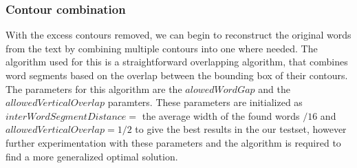 \documentclass{article}
\begin{document}
\subsubsection{Contour combination}
With the excess contours removed, we can begin to reconstruct the original words from the text by combining multiple contours into one where needed.
The algorithm used for this is a straightforward overlapping algorithm, that combines word segments based on the overlap between the bounding box of their contours.
The parameters for this algorithm are the $alowedWordGap$ and the $allowedVerticalOverlap$ paramters.
These parameters are initialized as $interWordSegmentDistance = $ the average width of the found words $ / 16 $ and $allowedVerticalOverlap = 1/2$ to give the best results in the our testset, however further experimentation with these parameters and the algorithm is required to find a more generalized optimal solution.
\end{document}
